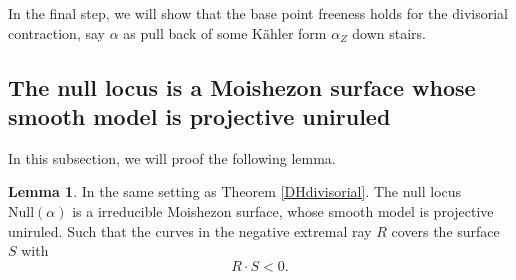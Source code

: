 \documentclass[11pt]{article}
\theoremstyle{definition}
\newtheorem{lemma}[theorem]{Lemma}
\begin{document}
	In the final step, we will show that the base point freeness holds for the divisorial contraction, say $\alpha$ as pull back of some K\"ahler form $\alpha_Z$ down stairs. 
	
	\subsection{The null locus is a Moishezon surface whose smooth model is projective uniruled}
	In this subsection, we will proof the following lemma.
	\begin{lemma}
		In the same setting as Theorem \ref{DHdivisorial}. The null locus $\text{Null}(\alpha)$ is a irreducible Moishezon surface, whose smooth model is projective uniruled. Such that the curves in the negative extremal ray $R$ covers the surface $S$ with $$R \cdot S <0.$$
	\end{lemma}
\end{document}
